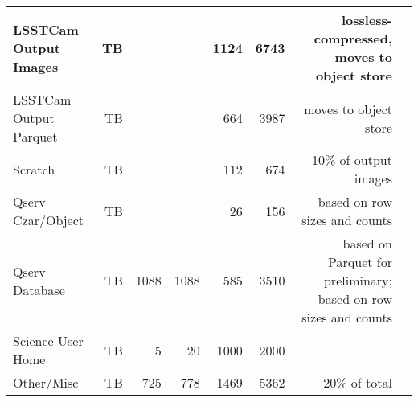 \begin{longtable} { |p{}  |r  |r  |r  |r  |r  |r  |r |}
{LSSTCam Output Images}&{TB}&{}&{}&{1124}&{6743}&{lossless-compressed, moves to object store} \\ \hline
{LSSTCam Output Parquet}&{TB}&{}&{}&{664}&{3987}&{moves to object store} \\ \hline
{Scratch}&{TB}&{}&{}&{112}&{674}&{10\% of output images} \\ \hline
{Qserv Czar/Object}&{TB}&{}&{}&{26}&{156}&{based on row sizes and counts} \\ \hline
{Qserv Database}&{TB}&{1088}&{1088}&{585}&{3510}&{based on Parquet for preliminary; based on row sizes and counts} \\ \hline
{Science User Home}&{TB}&{5}&{20}&{1000}&{2000}& \\ \hline
{Other/Misc}&{TB}&{725}&{778}&{1469}&{5362}&{20\% of total} \\ \hline
\end{longtable} \normalsize

